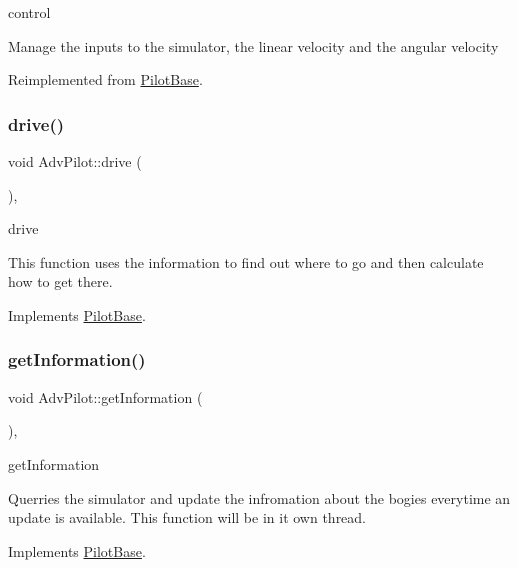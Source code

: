 control 

Manage the inputs to the simulator, the linear velocity and the angular velocity 

Reimplemented from \hyperlink{classPilotBase_a611edd0c1a501e1bb6722f5b62e95d6b}{Pilot\+Base}.

\mbox{\label{classAdvPilot_a06a08829ecef443f01860f48fc462c22}} 
\subsubsection{\texorpdfstring{drive()}{drive()}}
{\footnotesize\ttfamily void Adv\+Pilot\+::drive (\begin{DoxyParamCaption}{ }\end{DoxyParamCaption})\hspace{0.3cm}{\ttfamily [protected]}, {\ttfamily [virtual]}}



drive 

This function uses the information to find out where to go and then calculate how to get there. 

Implements \hyperlink{classPilotBase_ad4a3db2cf9d40b5936dba864977eee95}{Pilot\+Base}.

\mbox{\label{classAdvPilot_a1a7f8ca0d8c97120fa2c93f7e512c944}} 
\subsubsection{\texorpdfstring{get\+Information()}{getInformation()}}
{\footnotesize\ttfamily void Adv\+Pilot\+::get\+Information (\begin{DoxyParamCaption}{ }\end{DoxyParamCaption})\hspace{0.3cm}{\ttfamily [protected]}, {\ttfamily [virtual]}}



get\+Information 

Querries the simulator and update the infromation about the bogies everytime an update is available. This function will be in it own thread. 

Implements \hyperlink{classPilotBase_a0c3cfd1b468842734e3706ff8dea133b}{Pilot\+Base}.


